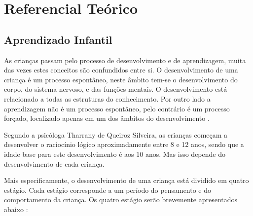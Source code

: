 \chapter[Referencial Teórico]{Referencial Teórico}

\section{Aprendizado Infantil}

As crianças passam pelo processo de desenvolvimento e de aprendizagem, muita das vezes estes conceitos são confundidos entre si. O desenvolvimento de uma criança é um processo espontâneo, neste âmbito tem-se o desenvolvimento do corpo, do sistema nervoso, e das funções mentais. O desenvolvimento está relacionado a todas as estruturas do conhecimento. Por outro lado a aprendizagem não é um processo espontâneo, pelo contrário é um processo forçado, localizado apenas em um dos âmbitos do desenvolvimento \cite{piaget:1972}.

Segundo a psicóloga Tharrany de Queiroz Silveira, as crianças começam a desenvolver o raciocínio lógico aproximadamente entre 8 e 12 anos,  sendo que a idade base para este desenvolvimento é aos 10 anos. Mas isso depende do desenvolvimento de cada criança.

Mais especificamente, o desenvolvimento de uma criança está dividido em quatro estágio. Cada estágio corresponde a um período do pensamento e do comportamento da criança. Os quatro estágio serão brevemente apresentados abaixo \cite{piaget:1972}:

